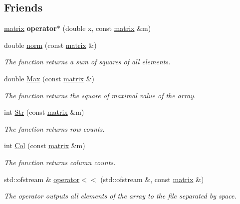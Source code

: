 \subsection*{Friends}
\begin{DoxyCompactItemize}
\item 
\mbox{\label{classmatrix_a0f99416a4edc54f3db2dd8c5f7d546c5}} 
\mbox{\hyperlink{classmatrix}{matrix}} {\bfseries operator$\ast$} (double x, const \mbox{\hyperlink{classmatrix}{matrix}} \&m)
\item 
\mbox{\label{classmatrix_a488a52731e335f04938b08f64a776f67}} 
double \mbox{\hyperlink{classmatrix_a488a52731e335f04938b08f64a776f67}{norm}} (const \mbox{\hyperlink{classmatrix}{matrix}} \&)
\begin{DoxyCompactList}\small\item\em The function returns a sum of squares of all elements. \end{DoxyCompactList}\item 
\mbox{\label{classmatrix_afead99146c1b79688d6609bb2b061808}} 
double \mbox{\hyperlink{classmatrix_afead99146c1b79688d6609bb2b061808}{Max}} (const \mbox{\hyperlink{classmatrix}{matrix}} \&)
\begin{DoxyCompactList}\small\item\em The function returns the square of maximal value of the array. \end{DoxyCompactList}\item 
int \mbox{\hyperlink{classmatrix_a55ecd7691eca1e7dac81020e9bd69038}{Str}} (const \mbox{\hyperlink{classmatrix}{matrix}} \&m)
\begin{DoxyCompactList}\small\item\em The function returns row counts. \end{DoxyCompactList}\item 
int \mbox{\hyperlink{classmatrix_a54850708093c314282f7f9c8162a493b}{Col}} (const \mbox{\hyperlink{classmatrix}{matrix}} \&m)
\begin{DoxyCompactList}\small\item\em The function returns column counts. \end{DoxyCompactList}\item 
\mbox{\label{classmatrix_afadd635c5216a55b00380d8374c7eeac}} 
std\+::ofstream \& \mbox{\hyperlink{classmatrix_afadd635c5216a55b00380d8374c7eeac}{operator$<$$<$}} (std\+::ofstream \&, const \mbox{\hyperlink{classmatrix}{matrix}} \&)
\begin{DoxyCompactList}\small\item\em The operator outputs all elements of the array to the file separated by space. \end{DoxyCompactList}\end{DoxyCompactItemize}



